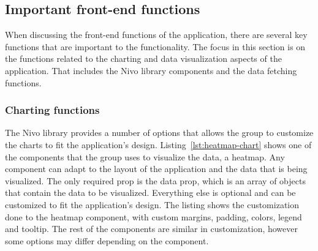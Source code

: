 \subsection{Important front-end functions}\label{subsec:important-front-end-functions}

When discussing the front-end functions of the application, there are several key functions that are important to the
functionality.
The focus in this section is on the functions related to the charting and data visualization aspects of the application.
That includes the Nivo library components and the data fetching functions.

\subsubsection{Charting functions}\label{subsubsec:charting-functions}

The Nivo library provides a number of options that allows the group to customize the charts to fit the application's
design.
Listing~\ref{lst:heatmap-chart} shows one of the components that the group uses to visualize the data, a heatmap.
Any component can adapt to the layout of the application and the data that is being visualized.
The only required prop is the data prop, which is an array of objects that contain the data to be visualized.
Everything else is optional and can be customized to fit the application's design.
The listing shows the customization done to the heatmap component, with custom margins, padding, colors, legend and
tooltip.
The rest of the components are similar in customization, however some options may differ depending on the component.

